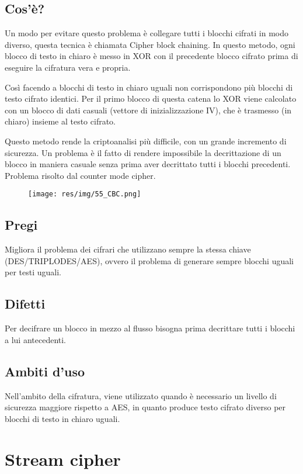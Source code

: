 \subsection{Cos'è?}
Un modo per evitare questo problema è collegare tutti i blocchi cifrati in modo diverso, questa tecnica è chiamata Cipher block chaining.
In questo metodo, ogni blocco di testo in chiaro è messo in XOR con il precedente blocco cifrato prima di eseguire la cifratura vera e propria.

Così facendo a blocchi di testo in chiaro uguali non corrispondono più blocchi di testo cifrato identici. Per il primo blocco di questa catena lo XOR viene calcolato con un blocco di dati casuali (vettore di inizializzazione IV), che è trasmesso (in chiaro) insieme al testo cifrato.

Questo metodo rende la criptoanalisi più difficile, con un grande incremento di sicurezza. Un problema è il fatto di rendere impossibile la decrittazione di un blocco in maniera casuale senza prima aver decrittato tutti i blocchi precedenti. Problema risolto dal counter mode cipher.

\begin{figure}[H]
\centering
\texttt{[image: res/img/55\_CBC.png]}
\end{figure}

\subsection{Pregi}
Migliora il problema dei cifrari che utilizzano sempre la stessa chiave (DES/TRIPLODES/AES), ovvero il problema di generare sempre blocchi uguali per testi uguali. 
\subsection{Difetti}
Per decifrare un blocco in mezzo al flusso bisogna prima decrittare tutti i blocchi a lui antecedenti.
\subsection{Ambiti d'uso}
Nell'ambito della cifratura, viene utilizzato quando è necessario un livello di sicurezza maggiore rispetto a AES, in quanto produce testo cifrato diverso per blocchi di testo in chiaro uguali.

\section{Stream cipher}
